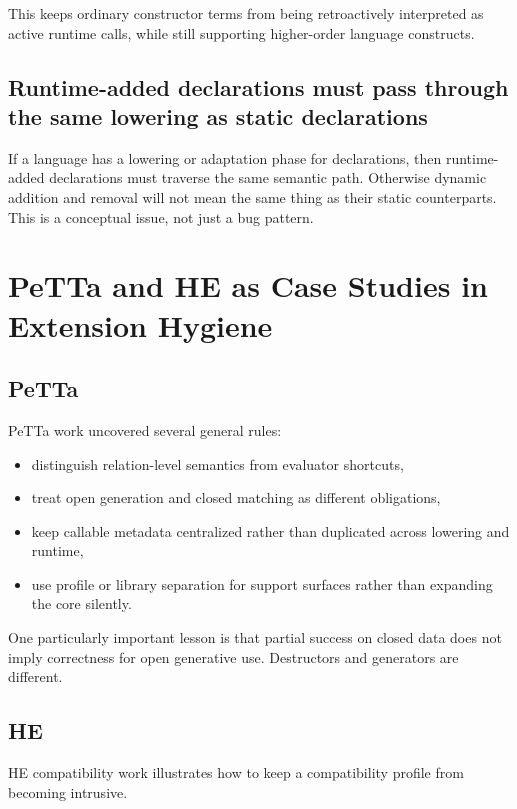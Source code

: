 \documentclass[11pt]{article}
\begin{document}
This keeps ordinary constructor terms from being retroactively interpreted as active runtime calls, while still supporting higher-order language constructs.

\subsection{Runtime-added declarations must pass through the same lowering as static declarations}

If a language has a lowering or adaptation phase for declarations, then runtime-added declarations must traverse the same semantic path. Otherwise dynamic addition and removal will not mean the same thing as their static counterparts. This is a conceptual issue, not just a bug pattern.

\section{PeTTa and HE as Case Studies in Extension Hygiene}

\subsection{PeTTa}

PeTTa work uncovered several general rules:

\begin{itemize}
  \item distinguish relation-level semantics from evaluator shortcuts,
  \item treat open generation and closed matching as different obligations,
  \item keep callable metadata centralized rather than duplicated across lowering and runtime,
  \item use profile or library separation for support surfaces rather than expanding the core silently.
\end{itemize}

One particularly important lesson is that partial success on closed data does not imply correctness for open generative use. Destructors and generators are different.

\subsection{HE}

HE compatibility work illustrates how to keep a compatibility profile from becoming intrusive.
\end{document}
